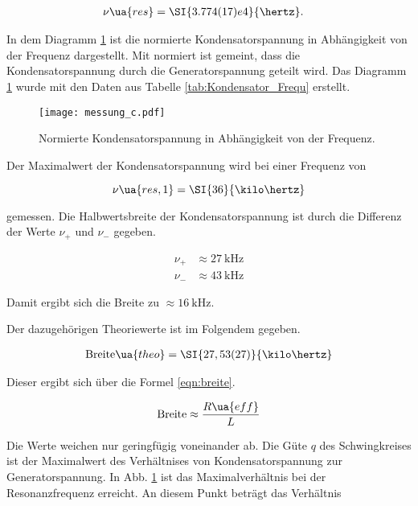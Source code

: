 \begin{align*}
  \nu\ua{res} &= \SI{3.774(17)e4}{\hertz}.
\end{align*}

In dem Diagramm \ref{fig:Kondensator_Frequ} ist die normierte Kondensatorspannung
in Abhängigkeit von der Frequenz dargestellt. Mit normiert ist gemeint, dass die
Kondensatorspannung durch die Generatorspannung geteilt wird.
Das Diagramm \ref{fig:Kondensator_Frequ} wurde mit den Daten aus Tabelle \ref{tab:Kondensator_Frequ}
erstellt.

\begin{figure}
  \centering
  \texttt{[image: messung\_c.pdf]}
  \caption{Normierte Kondensatorspannung in Abhängigkeit von der Frequenz.}
  \label{fig:Kondensator_Frequ}
\end{figure}

Der Maximalwert der Kondensatorspannung wird bei einer Frequenz von

\begin{equation}
  \label{eqn:Resonanzfrequenz}
  \nu\ua{res,1} = \SI{36}{\kilo\hertz}
\end{equation}

gemessen. Die Halbwertsbreite der Kondensatorspannung ist durch die Differenz der Werte
$\nu_+$ und $\nu_-$ gegeben.

\begin{align*}
  \nu_+ &\approx \SI{27}{\kilo\hertz} \\
  \nu_- &\approx \SI{43}{\kilo\hertz}
\end{align*}

Damit ergibt sich die Breite zu $\approx \SI{16}{\kilo\hertz}$.

Der dazugehörigen Theoriewerte ist im Folgendem gegeben.

\begin{align*}
  \text{Breite}\ua{theo} &= \SI{27,53(27)}{\kilo\hertz} \\
\end{align*}

Dieser ergibt sich über die Formel \eqref{eqn:breite}.

\begin{equation}
  \label{eqn:breite}
  \text{Breite} \approx \frac{R\ua{eff}}{L}
\end{equation}

Die Werte weichen nur geringfügig voneinander ab.
Die Güte $q$ des Schwingkreises ist der Maximalwert des Verhältnises von
Kondensatorspannung zur Generatorspannung.
In Abb. \ref{fig:Kondensator_Frequ} ist das Maximalverhältnis bei der
Resonanzfrequenz erreicht. An diesem Punkt beträgt das Verhältnis

